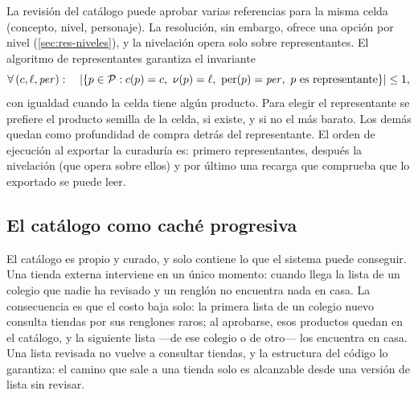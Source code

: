 La revisión del catálogo puede aprobar varias referencias para la misma celda
(concepto, nivel, personaje). La resolución, sin embargo, ofrece una opción por
nivel (\cref{sec:res-niveles}), y la nivelación opera solo sobre
representantes. El algoritmo de representantes garantiza el invariante
\[
  \forall\,(c,\ell,\mathit{per}):\quad
  \card{\{p\in\Prod : c(p)=c,\ \nivel(p)=\ell,\ \mathrm{per}(p)=\mathit{per},\
  p \text{ es representante}\}}\leq 1,
\]
con igualdad cuando la celda tiene algún producto. Para elegir el
representante se prefiere el producto semilla de la celda, si existe, y si no
el más barato. Los demás quedan como profundidad de compra detrás del
representante. El orden de ejecución al exportar la curaduría es: primero
representantes, después la nivelación (que opera sobre ellos) y por último una
recarga que comprueba que lo exportado se puede leer.

\subsection{El catálogo como caché progresiva}
\label{sec:cat-cache}

El catálogo es propio y curado, y solo contiene lo que el sistema puede
conseguir. Una tienda externa interviene en un único momento: cuando llega la
lista de un colegio que nadie ha revisado y un renglón no encuentra nada en
casa. La consecuencia es que el costo baja solo: la primera lista de un
colegio nuevo consulta tiendas por sus renglones raros; al aprobarse, esos
productos quedan en el catálogo, y la siguiente lista ---de ese colegio o de
otro--- los encuentra en casa. Una lista revisada no vuelve a consultar
tiendas, y la estructura del código lo garantiza: el camino que sale a una
tienda solo es alcanzable desde una versión de lista sin revisar.

